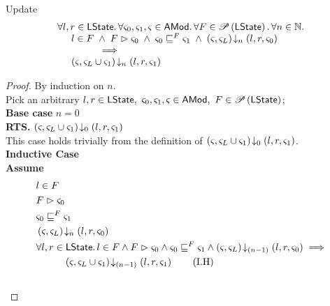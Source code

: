 %
%
\begin{lemma}[] \label{lem:amodHiding} \todo Update
%
\[
\begin{array}{l}
	\forall l, r \in \textsf{LState}.\, \forall \varsigma_{0}, \varsigma_{1}, \varsigma_{} \in \textsf{AMod}.\, \forall  F \in \mathscr{P}\left(\textsf{LState} \right).\, \forall n \in \mathbb{N}.\, \\
	
	\hspace*{0.5cm} 
	l \in F \;\land\; 
	F \mathrel{\rhd} \varsigma_{0} \;\land\; 
	\varsigma_{0} \sqsubseteq^{F} \varsigma_{1}\;\land\;
	\left(\varsigma_{}, \varsigma_{L}\right) \!\downarrow_{n} \left(l, r, \varsigma_{0}\right)\\
	
	\hspace*{1.5cm} \implies\\
	
	
	\hspace*{0.5cm}
	\left(\varsigma_{}, \varsigma_{L} \cup \varsigma_{1}\right) \!\downarrow_{n} \left(l, r, \varsigma_{1}\right)\\
\end{array}
\]
%
\begin{proof}
By induction on $n$. \\
Pick an arbitrary $l, r \in \textsf{LState},\ \varsigma_{0}, \varsigma_{1}, \varsigma_{} \in \textsf{AMod},\  F \in \mathscr{P}\left(\textsf{LState} \right)$;\\
\noindent\textbf{Base case} $n = 0$\\
\textbf{RTS. } $\left(\varsigma_{}, \varsigma_{L} \cup \varsigma_{1}\right) \!\downarrow_{0} \left(l, r, \varsigma_{1}\right)$\\
This case holds trivially from the definition of $\left(\varsigma_{}, \varsigma_{L} \cup \varsigma_{1}\right) \!\downarrow_{0} \left(l, r, \varsigma_{1}\right)$.\\

\noindent\textbf{Inductive Case}\\
\textbf{Assume}
\begin{align}
	&l \in F \label{L2:Ass1}\\
	&F \fences \amod{0} \label{L2:Ass2}\\
	&\amod{0} \weakenI{F} \amod{1}\label{L2:Ass4}\\
	& \extendsAMUpto{\amod{}, \amod{L}}{n}{l}{r}{\amod{0}} \label{L2:Ass5}\\
%
	&\for{l, r \in \LStates} l \in F \land F \fences \amod{0} \land \amod{0} \weakenI{F} \amod{1} \land \extendsAMUpto{\amod{}, \amod{L}}{(n-1)}{l}{r}{\amod{0}}
	\implies \nonumber\\
	&\hspace*{1cm}\extendsAMUpto{\amod{}, \amod{L} \cup \amod{1}}{(n-1)}{l}{r}{\amod{1}} \tag{I.H}\label{L2:I.H}\\\nonumber
\end{align}


\end{proof}
\end{lemma}
